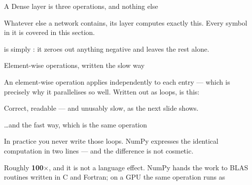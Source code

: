 \documentclass[aspectratio=169,11pt,t]{beamer}
\begin{document}

\begin{frame}[shrink=25]{A Dense layer is three operations, and nothing else}
{\fontsize{9.4}{12.6}\selectfont\color{fg2}Whatever else a network contains, its  layer computes exactly this. Every symbol in it is covered in this section.\par}\vskip 4pt
{\fontsize{9.4}{12.6}\selectfont\color{fg2} is simply : it zeroes out anything negative and leaves the rest alone.\par}\vskip 4pt
\end{frame}

\begin{frame}[shrink=25]{Element-wise operations, written the slow way}
{\fontsize{9.4}{12.6}\selectfont\color{fg2}An element-wise operation applies independently to each entry --- which is precisely why it parallelises so well. Written out as loops,  is this:\par}\vskip 4pt
{\fontsize{9.4}{12.6}\selectfont\color{fg2}Correct, readable --- and unusably slow, as the next slide shows.\par}\vskip 4pt
\end{frame}

\begin{frame}[shrink=25]{\ldots{}and the fast way, which is the same operation}
{\fontsize{9.4}{12.6}\selectfont\color{fg2}In practice you never write those loops. NumPy expresses the identical computation in two lines --- and the difference is not cosmetic.\par}\vskip 4pt
\begin{minipage}[t]{0.494\textwidth}
\end{minipage}%
\hfill
\begin{minipage}[t]{0.494\textwidth}
\end{minipage}%
\begin{iband}[signal]
Roughly \textbf{100$\times$}, and it is not a language effect. NumPy hands the work to BLAS routines written in C and Fortran; on a GPU the same operation runs as 
\end{iband}
\end{frame}
\end{document}
